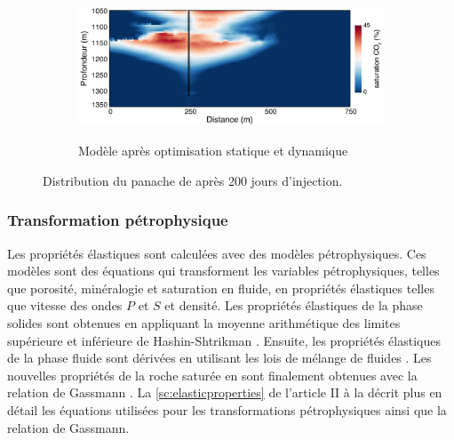 \begin{figure}[!ht]
        \begin{subfigure}[b]{0.7\textwidth}
                \caption{Modèle après optimisation statique et dynamique}
                \includegraphics[width=\textwidth]{fig/CO2_dg.pdf}
                \label{fig:CO2_dg}
        \end{subfigure}
        \caption{Distribution du panache de  après \num{200} jours
d'injection.}
        \label{fig:CO2_dist}
\end{figure}
\subsubsection{Transformation pétrophysique}
Les propriétés élastiques sont calculées avec des modèles pétrophysiques. Ces
modèles sont des équations qui transforment les variables pétrophysiques, telles
que porosité, minéralogie et saturation en fluide, en propriétés élastiques
telles que vitesse des ondes $P$ et $S$ et densité. Les propriétés élastiques de
la phase solides sont obtenues en appliquant la moyenne arithmétique des limites
supérieure et inférieure de Hashin-Shtrikman \citep{Hashin1963}. Ensuite, les
propriétés élastiques de la phase fluide sont dérivées en utilisant les lois de
mélange de fluides \citep{Grana2012}. Les nouvelles propriétés de la roche
saturée en  sont finalement obtenues avec la relation de Gassmann
\citet{Gassmann}. La \cref{sc:elasticproperties} de l'article II à la
 décrit plus en détail les équations utilisées
pour les transformations pétrophysiques ainsi que la relation de Gassmann.
